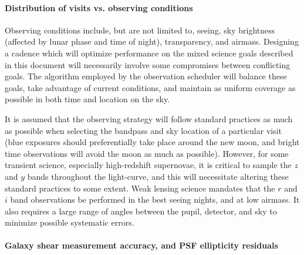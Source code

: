 \paragraph{Distribution of visits vs. observing conditions\\}

Observing conditions include, but are not limited to, seeing, sky
brightness (affected by lunar phase and time of night), transparency, and
airmass. Designing a cadence which will optimize performance on the mixed
science goals described in this document will necessarily involve some
compromises between conflicting goals. The algorithm employed by the
observation scheduler will balance these goals, take advantage of current
conditions, and maintain as uniform coverage as possible in both time and
location on the sky.

It is assumed that the observing strategy will follow standard practices as
much as possible when selecting the bandpass and sky location of a
particular visit (\eg blue exposures should preferentially take
place around the new moon, and bright time observations will avoid the moon
as much as possible). However, for some transient science, especially high-redshift
supernovae, it is critical to sample the $z$ and $y$ bands throughout the
light-curve, and this will necessitate altering these standard practices to
some extent. Weak lensing science mandates that the $r$ and $i$ band
observations be performed in the best seeing nights, and at low airmass. It
also requires a large range of angles between the pupil, detector, and sky
to minimize possible systematic errors.





\paragraph{Galaxy shear measurement accuracy, and PSF ellipticity residuals\\}
\label{sec:fullEllip}

